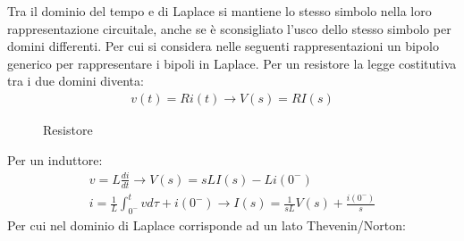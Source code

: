 \documentclass{article}
\numberwithin{equation}{subsection}
\begin{document}
Tra il dominio del tempo e di Laplace si mantiene lo stesso simbolo nella loro rappresentazione circuitale, anche se è sconsigliato l'usco dello 
stesso simbolo per domini differenti. Per cui si considera nelle seguenti rappresentazioni un bipolo generico per rappresentare i bipoli in Laplace. Per un resistore la legge costitutiva tra i due domini diventa:
\begin{gather*}
    v(t)=Ri(t)\to V(s)=RI(s)
\end{gather*}
\begin{figure}[ht]%
    \centering
    \qquad
    \caption{Resistore}
    \label{fig:resistore-tempo-laplace}
\end{figure}
Per un induttore:
\begin{gather*}
    v=\displaystyle L\frac{di}{dt}\to V(s)=sLI(s)-Li(0^-)\\
    i=\displaystyle\frac{1}{L}\int_{0^-}^tvd\tau+i(0^-)\to I(s)=\frac{1}{sL}V(s)+\frac{i(0^-)}{s}
\end{gather*}
Per cui nel dominio di Laplace corrisponde ad un lato Thevenin/Norton:
\end{document}
